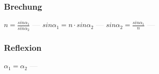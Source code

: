\subsubsection{Brechung} 
\begin{minipage}{0.45\textwidth} 
\end{minipage} 
\begin{minipage}{0.45\textwidth} 
 
\end{minipage} 
$ n = \frac{sin\alpha _{1} }{sin\alpha _{2} } $ \textcolor{lightgray}{\textbf{---}} 
$ sin\alpha _{1}  = n\cdot sin\alpha _{2} $ \textcolor{lightgray}{\textbf{---}} 
$ sin\alpha _{2}  = \frac{sin\alpha _{1} }{ n} $ \textcolor{lightgray}{\textbf{---}} 

\subsubsection{Reflexion} 
\begin{minipage}{0.45\textwidth} 
\end{minipage} 
\begin{minipage}{0.45\textwidth} 
 
\end{minipage} 
$ \alpha _{1}  = \alpha _{2} $ \textcolor{lightgray}{\textbf{---}} 

